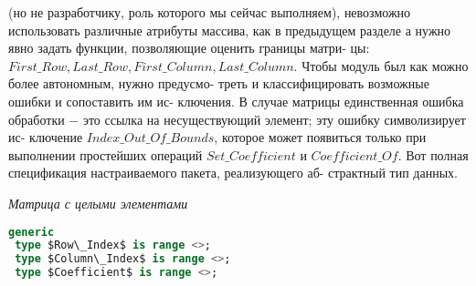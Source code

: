 (но не разработчику, роль которого мы сейчас выполняем), невозможно\linebreak
использовать различные атрибуты массива, как в предыдущем разделе\linebreak
а нужно явно задать функции, позволяющие оценить границы матри-\linebreak
цы: $First\_Row, Last\_Row, First\_Column, Last\_Column$.\newline
\hspace*{15pt}Чтобы модуль был как можно более автономным, нужно предусмо-\linebreak
треть  и  классифицировать  возможные ошибки  и  сопоставить им ис-\linebreak
ключения.  В случае матрицы единственная ошибка обработки $-$ это\linebreak
ссылка  на  несуществующий  элемент;  эту  ошибку  символизирует  ис-\linebreak
ключение $Index\_Out\_Of\_Bounds$, которое может появиться только при\linebreak
выполнении простейших операций $Set\_Coefficient$ и $Coefficient\_Of$.\newline
Вот полная спецификация настраиваемого пакета, реализующего аб-\linebreak
страктный тип данных.
\begin{center}
\textit{Матрица с целыми элементами}
\end{center}
\begin{lstlisting}[mathescape=true, language=Ada, frame=lrt]
generic
 type $Row\_Index$ is range <>;
 type $Column\_Index$ is range <>;
 type $Coefficient$ is range <>;
\end{lstlisting}
\newpage
